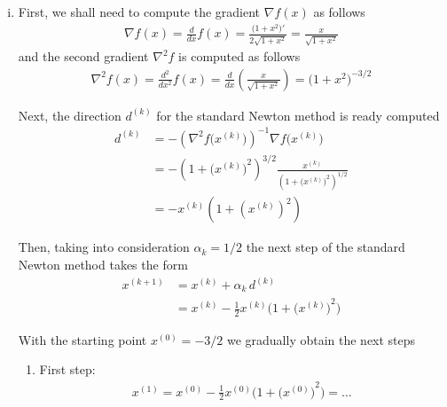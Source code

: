 \documentclass[12pt]{article}
\begin{document}
\begin{enumerate}[(i)]
	\item First, we shall need to compute
	      the gradient $\nabla f(x)$
	      as follows
	      \begin{align}
		      \label{eq:gradient1}
		      \nabla f (x)  
		      = 
		      \frac{d}{dx}f(x)
		      =
		      \frac{\big(1+x^2\big)'}{2\sqrt{1+x^2}}
		      =
		      \frac{x}{\sqrt{1+x^2}}
	      \end{align}
	      and the second gradient $\nabla^2 f$ is computed as follows
	      \begin{align}
		      \label{eq:gradient2}
		      \nabla^2 f(x) 
		      = 
		      \frac{d^2}{dx^2}f(x)
		      =
		      \frac{d}{dx}\left( \frac{x}{\sqrt{1+x^2}} \right)
		      =
		      \big(1+x^2\big)^{-3/2}
	      \end{align}
	      
	      Next, the direction $d^{(k)}$ for the standard Newton method is ready computed
	      \begin{align}
		      d^{(k)}
		       & = - {\left( \nabla^2 f\Big(x^{(k)}\Big) \right)}^{-1} \nabla f\Big(x^{(k)}\Big) \\
		       & = - {\left( 1+{\Big(x^{(k)}\Big)}^2 \right)}^{3/2}
		      \frac{x^{(k)}}{{\left( 1+{\Big(x^{(k)}\Big)}^2 \right)}^{1/2}}                     \\
		       & = - x^{(k)} \left(1 + {\left(x^{(k)} \right)}^2 \right)
	      \end{align}
	      
	      Then, taking into consideration $\alpha_{k} = 1/2$
	      the next step of the standard Newton method takes the form
	      \begin{align}
		      x^{(k+1)}
		       & = x^{(k)} + \alpha_k \, d^{(k)}                                        \\
		       & = x^{(k)} - \frac{1}{2} x^{(k)} \Bigg(1 + {\Big(x^{(k)}\Big)}^2 \Bigg)
	      \end{align}
	      
	      With the starting point $x^{(0)} = -3/2$ we gradually obtain the next steps
	      \begin{enumerate}
		      \item First step:
		            \begin{align}
			            x^{(1)} 
			            = x^{(0)} - \frac{1}{2} x^{(0)} \Bigg(1 + {\Big(x^{(0)}\Big)}^2 \Bigg)
			            = \dots
		            \end{align}
		            

\end{enumerate}
\end{enumerate}
\end{document}
